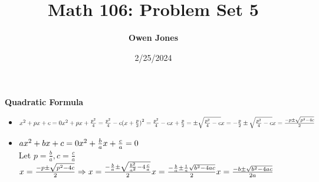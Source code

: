 \documentclass[10pt]{article}
\title{\bf Math 106: Problem Set 5}
\date{2/25/2024}
\author{\bf Owen Jones}
\begin{document}
\maketitle
\textbf{Quadratic Formula}
\begin{itemize}
    \item $x^2+px+c=0\\
    x^2+px+\frac{p^2}{4}=\frac{p^2}{4}-c\\
    {(x+\frac{p}{2})}^2=\frac{p^2}{4}-c\\
    x+\frac{p}{2}=\pm\sqrt{\frac{p^2}{4}-c}\\
    x=-\frac{p}{2}\pm\sqrt{\frac{p^2}{4}-c}\\
    x=\frac{-p\pm\sqrt{p^2-4c}}{2}$\\
    \item $ax^2+bx+c=0\\
    x^2+\frac{b}{a}x+\frac{c}{a}=0$\\
    Let $p=\frac{b}{a},c=\frac{c}{a}$\\
    $x=\frac{-p\pm\sqrt{p^2-4c}}{2}\Rightarrow x=\frac{-\frac{b}{a}\pm\sqrt{\frac{b^2}{a^2}-4\frac{c}{a}}}{2}\\
    x=\frac{-\frac{b}{a}\pm\frac{1}{a}\sqrt{b^2-4ac}}{2}\\
    x=\frac{-b\pm\sqrt{b^2-4ac}}{2a}$
\end{itemize}
\end{document}
